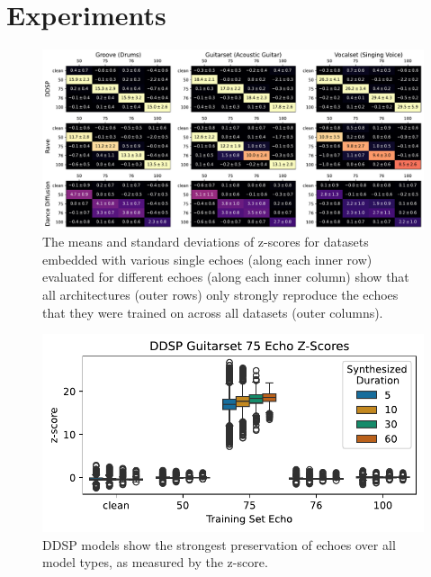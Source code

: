 \documentclass[letterpaper]{article} %
\begin{document}
\section{Experiments}

\begin{figure}
    \centering
    \includegraphics[width=\textwidth]{figs/AllSingleEchoZScores.pdf}
    
    \caption{The means and standard deviations of z-scores for datasets embedded with various single echoes (along each inner row) evaluated for different echoes (along each inner column) show that all architectures (outer rows) only strongly reproduce the echoes that they were trained on across all datasets (outer columns).}
    \label{fig:singleechotable}
\end{figure}

\begin{figure}
    \centering
    \includegraphics[width=\columnwidth]{figs/DDSPZScoreExamples.pdf}
    \caption{DDSP models show the strongest preservation of echoes over all model types, as measured by the z-score.}
    \label{fig:ddspzscoreexamples}
\end{figure}
\end{document}
